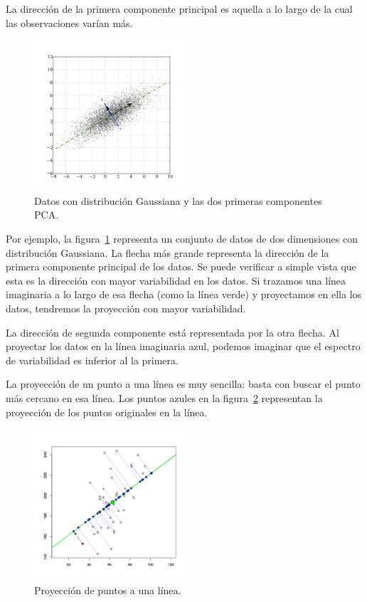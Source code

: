 \documentclass[11pt,spanish,listoffigures,listoftables]{tfgetsinf}
\begin{document}
    La dirección de la primera componente principal es aquella a lo largo de la cual las observaciones varían más.
    
    \begin{figure}[h]
        \centering
        \includegraphics[width=0.5\textwidth]{GaussianScatterPCA.png}
        \caption{Datos con distribución Gaussiana y las dos primeras componentes PCA.}
        \label{fig:pca1}
    \end{figure}    
   
    Por ejemplo, la figura~\ref{fig:pca1} representa un conjunto de datos de dos dimensiones con distribución Gaussiana. La flecha más grande representa la dirección de la primera componente principal de los datos. Se puede verificar a simple vista que esta es la dirección con mayor variabilidad en los datos. Si trazamos una línea imaginaria a lo largo de esa flecha (como la línea verde) y proyectamos en ella los datos, tendremos la proyección con mayor variabilidad. 
    
    La dirección de segunda componente está representada por la otra flecha. Al proyectar los datos en la línea imaginaria azul, podemos imaginar que el espectro de variabilidad es inferior al la primera.
   
    La proyección de un punto a una línea es muy sencilla: basta con buscar el punto más cercano en esa línea. Los puntos azules en la figura~\ref{fig:pca_projection} representan la proyección de los puntos originales en la línea.

    \begin{figure}[h]
        \centering
        \includegraphics[width=0.5\textwidth]{ProjectionPCA.jpg}
        \caption{Proyección de puntos a una línea.}
        \label{fig:pca_projection}
    \end{figure}    
    
\end{document}
